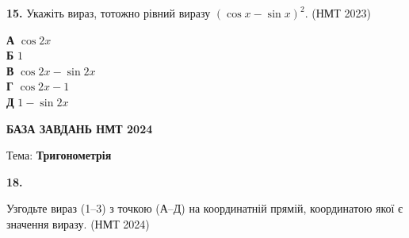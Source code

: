 \documentclass[14pt]{extarticle}
\newcommand{\nmtyear}[1]{\hfill{\small\color{yearcolor}(НМТ #1)}}
\begin{document}
\vspace{0.7cm}

\noindent\textbf{15.} Укажіть вираз, тотожно рівний виразу $(\cos x - \sin x)^2$. \nmtyear{2023}


\vspace{0.3cm}
\noindent
\textbf{А} \quad $\cos 2x$ \\[0.3cm]
\textbf{Б} \quad $1$ \\[0.3cm]
\textbf{В} \quad $\cos 2x - \sin 2x$ \\[0.3cm]
\textbf{Г} \quad $\cos 2x - 1$ \\[0.3cm]
\textbf{Д} \quad $1 - \sin 2x$
\vspace{0.7cm}



\begin{center}
{\Large\textbf{\color{headerblue}БАЗА ЗАВДАНЬ НМТ 2024}}
\end{center}

\begin{center}
{\large Тема: \textbf{Тригонометрія}}
\end{center}

\noindent\textbf{18.} \begin{minipage}[t]{0.55\textwidth}
Узгодьте вираз (1--3) з точкою (А--Д) на координатній прямій, координатою якої є значення виразу.
 \nmtyear{2024}
\end{minipage}
\hfill
\begin{minipage}[t]{0.4\textwidth}
    \vspace{0.2cm}
    \begin{flushright}
    \end{flushright}
\end{minipage}

\vspace{0.3cm}
\end{document}
